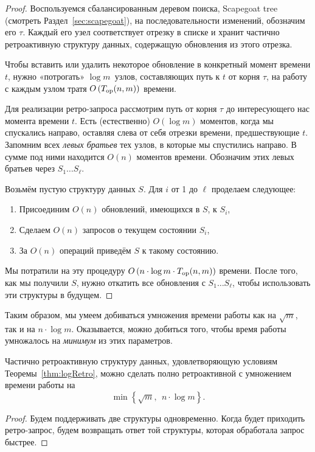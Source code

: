 \begin{proof}
	Воспользуемся сбалансированным деревом поиска, Scapegoat tree (смотреть Раздел~\ref{sec:scapegoat}), на последовательности изменений, обозначим его $\tau$. Каждый его узел соответствует отрезку в списке и хранит частично ретроактивную структуру данных, содержащую обновления из этого отрезка.

	Чтобы вставить или удалить некоторое обновление в конкретный момент времени $t$, нужно «потрогать» $\log m$~узлов, составляющих путь к $t$ от корня $\tau$, на работу с каждым узлом тратя $O \left( T_{\mathrm{op}} (n,m) \right)$ времени.
	
	Для реализации ретро-запроса рассмотрим путь от корня $\tau$ до интересующего нас момента времени $t$. Есть (естественно) $O (\log m)$ моментов, когда мы спускались направо, оставляя слева от себя отрезки времени, предшествующие $t$. Запомним всех {\itshape левых братьев} тех узлов, в которые мы спустились направо. В сумме под ними находится $O(n)$ моментов времени. Обозначим этих левых братьев через $S_1 \ldots S_\ell$.

	Возьмём пустую структуру данных $S$. Для $i$ от 1 до $\ell$ проделаем следующее:
     \begin{enumerate}
	\item Присоединим $O(n)$ обновлений, имеющихся в $S$, к $S_i$,
	\item Сделаем $O(n)$ запросов о текущем состоянии $S_i$,
	\item За $O(n)$ операций приведём $S$ к такому состоянию.
     \end{enumerate}

	Мы потратили на эту процедуру $O \left( n \cdot \log m \cdot T_{\mathrm{op}} (n,m) \right)$ времени. После того, как мы получили $S$, нужно откатить все обновления с $S_1 \ldots S_\ell$, чтобы использовать эти структуры в будущем.
\end{proof}

Таким образом, мы умеем добиваться умножения времени работы как на $\sqrt{m}$, так и на $n \cdot \log m$. Оказывается, можно добиться того, чтобы время работы умножалось на {\it минимум} из этих параметров.

\begin{corollary}
	Частично ретроактивную структуру данных, удовлетворяющую условиям Теоремы~\ref{thm:logRetro}, можно сделать полно ретроактивной с умножением времени работы на
     \begin{equation*}
	\min \left\{ \sqrt m,\ \ n \cdot \log m \right\}.
     \end{equation*}
\end{corollary}

\begin{proof}
	Будем поддерживать две структуры одновременно. Когда будет приходить ретро-запрос, будем возвращать ответ той структуры, которая обработала запрос быстрее.
\end{proof}
